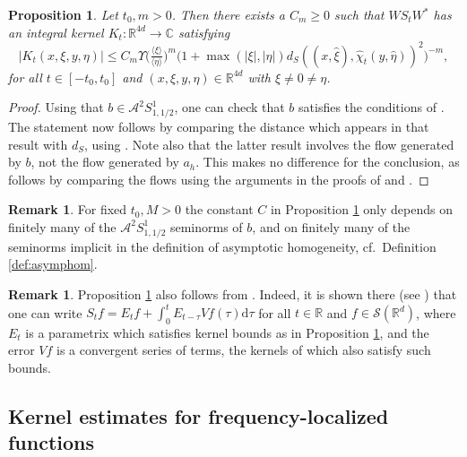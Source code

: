 \documentclass{amsart}
\numberwithin{equation}{section}
\newtheorem{proposition}[theorem]{Proposition}
\theoremstyle{definition}
\newtheorem{remark}[theorem]{Remark}
\newcommand{\R}{\mathbb{R}}
\newcommand{\Rd}{\mathbb{R}^{d}}
\newcommand{\C}{\mathbb{C}}
\newcommand {\A}{\mathcal{A}}
\newcommand {\ud}{\mathrm{d}}
\newcommand {\Sw}{\mathcal{S}}
\newcommand {\rb}{\rangle}
\newcommand {\lb}{\langle}
\begin{document}
\begin{proposition}\label{prop:kernelbounds}
Let $t_{0},m>0$. Then there exists a $C_{m}\geq0$ such that $WS_{t}W^{*}$ has an integral kernel $K_{t}:\R^{4d}\to\C$ satisfying 
\[
|K_{t}(x,\xi,y,\eta)|\leq C_{m} \Upsilon \big( \tfrac{\lb\xi\rb}{\lb\eta\rb} \big)^{m}\big(1+\max(| \xi |,|\eta|)d_{S}((x,\hat{\xi}),\hat{\chi}_{t}(y,\hat{\eta}))^{2}\big)^{-m},
\]
for all $t\in[-t_{0},t_{0}]$ and $(x,\xi,y,\eta)\in \R^{4d}$ with $\xi\neq 0\neq \eta$.
\end{proposition}
\begin{proof}
Using that $b\in \A^{2}S^{1}_{1,1/2}$, one can check that $b$ satisfies the conditions of \cite[Theorem 6.2]{GebaTataru2007}. The statement now follows by comparing the distance which appears in that result with $d_{S}$, using \cite[Theorem 2.5]{GebaTataru2007}. Note also that the latter result involves the flow generated by $b$, not the flow generated by $a_{h}$. This makes no difference for the conclusion, as follows by comparing the flows using the arguments in the proofs of \cite[Proposition 7.5]{GebaTataru2007} and \cite[Theorem 8.1]{HassellRozendaal2023}. 
\end{proof}

\begin{remark}\label{rem:kernelboundsconstant}
For fixed $t_{0},M>0$ the constant $C$ in Proposition \ref{prop:kernelbounds} only depends on finitely many of the $\A^{2}S^{1}_{1,1/2}$ seminorms of $b$, and on finitely many of the seminorms implicit in the definition of asymptotic homogeneity, cf.~Definition \ref{def:asymphom}. 
\end{remark}

\begin{remark}\label{rem:otherproof}
Proposition \ref{prop:kernelbounds} also follows from \cite{HassellRozendaal2023}. Indeed, it is shown there (see \cite[Remark 7.2 and Sections 8 and 9]{HassellRozendaal2023}) that one can write $S_{t}f=E_{t}f+\int_{0}^{t}E_{t-\tau}Vf(\tau)\ud \tau$ for all $t\in\R$ and $f\in\Sw(\Rd)$, where $E_{t}$ is a parametrix which satisfies kernel bounds as in Proposition \ref{prop:kernelbounds}, and the error $Vf$ is a convergent series of terms, the kernels of which also satisfy such bounds. 
\end{remark}

\subsection{Kernel estimates for frequency-localized functions}
\end{document}
